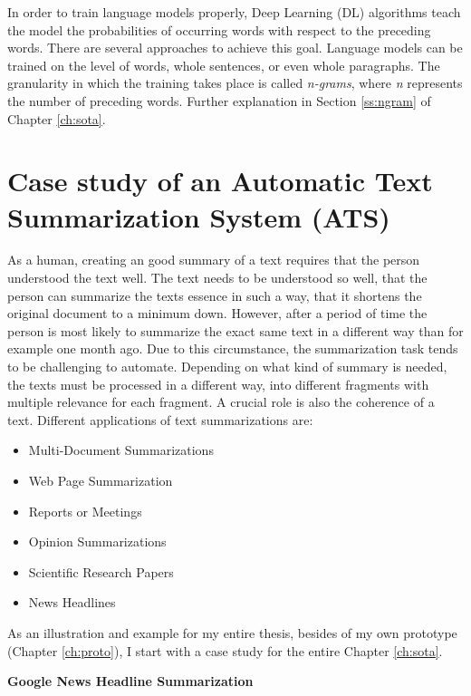 In order to train language models properly, Deep Learning (DL) algorithms teach the model the probabilities of occurring words with respect to the preceding words. There are several approaches to achieve this goal. Language models can be trained on the level of words, whole sentences, or even whole paragraphs. The granularity in which the training takes place is called \textit{n-grams}, where \textit{n} represents the number of preceding words. Further explanation in Section \ref{ss:ngram} of Chapter \ref{ch:sota}. 


\section{Case study of an Automatic Text Summarization System (ATS)}\label{ss:case}

As a human, creating an good summary of a text requires that the person understood the text well. The text needs to be understood so well, that the person can summarize the texts essence in such a way, that it shortens the original document to a minimum down. However, after a period of time the person is most likely to summarize the exact same text in a different way than for example one month ago. Due to this circumstance, the summarization task tends to be challenging to automate. Depending on what kind of summary is needed, the texts must be processed in a different way, into different fragments with multiple relevance for each fragment. A crucial role is also the coherence of a text. Different applications of text summarizations are:

\begin{itemize}
	\item Multi-Document Summarizations
	\item Web Page Summarization
	\item Reports or Meetings
	\item Opinion Summarizations
	\item Scientific Research Papers
	\item News Headlines
\end{itemize}

As an illustration and example for my entire thesis, besides of my own prototype (Chapter \ref{ch:proto}), I start with a case study for the entire Chapter \ref{ch:sota}. 

\textbf{Google News Headline Summarization}

